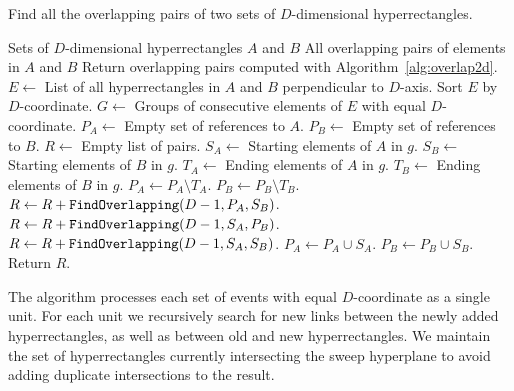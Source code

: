 \documentclass[english,gradu]{tktltiki2018}
\begin{document}
\begin{algorithm}
\caption{Find all the overlapping pairs of two sets of $D$-dimensional hyperrectangles.}
\label{alg:overlapdd}
\begin{algorithmic}
\Require Sets of $D$-dimensional hyperrectangles $A$ and $B$
\Ensure All overlapping pairs of elements in $A$ and $B$
		\State Return overlapping pairs computed with Algorithm~\ref{alg:overlap2d}.
	\EndIf
	\State $E\gets$ List of all hyperrectangles in $A$ and $B$ perpendicular to $D$-axis.
	\State Sort $E$ by $D$-coordinate.
	\State $G\gets$ Groups of consecutive elements of $E$ with equal $D$-coordinate.
	\State $P_A\gets$ Empty set of references to $A$.
	\State $P_B\gets$ Empty set of references to $B$.
	\State $R\gets$ Empty list of pairs.
		\State $S_A\gets$ Starting elements of $A$ in $g$.
		\State $S_B\gets$ Starting elements of $B$ in $g$.
		\State $T_A\gets$ Ending elements of $A$ in $g$.
		\State $T_B\gets$ Ending elements of $B$ in $g$.
		\State $P_A\gets P_A\setminus T_A$.
		\State $P_B\gets P_B\setminus T_B$.
		\State $R\gets R + \texttt{FindOverlapping}(D-1,P_A,S_B)$.
		\State $R\gets R + \texttt{FindOverlapping}(D-1,S_A,P_B)$.
		\State $R\gets R + \texttt{FindOverlapping}(D-1,S_A,S_B)$.
		\State $P_A\gets P_A\cup S_A$.
		\State $P_B\gets P_B\cup S_B$.
	\EndFor
	\State Return $R$.
\EndProcedure
\end{algorithmic}
\end{algorithm}

The algorithm processes each set of events with equal $D$-coordinate as a single unit.
For each unit we recursively search for new links between the newly added hyperrectangles, as well as between old and new hyperrectangles.
We maintain the set of hyperrectangles currently intersecting the sweep hyperplane to avoid adding duplicate intersections to the result.
\end{document}
